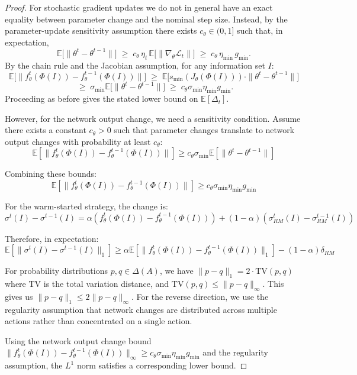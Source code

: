 \documentclass[12pt,a4paper]{article}
\begin{document}
\begin{proof}
For stochastic gradient updates we do not in general have an exact equality between parameter change and the nominal step size.  Instead, by the parameter-update sensitivity assumption there exists $c_\theta\in(0,1]$ such that, in expectation,
    \[
    \mathbb{E}\big[\|\theta^t - \theta^{t-1}\|\big] \;\ge\; c_\theta\,\eta_t\,\mathbb{E}\big[\|\nabla_\theta \mathcal{L}_t\|\big]
    \;\ge\; c_\theta\,\eta_{\min}\,g_{\min}.
    \]
    By the chain rule and the Jacobian assumption, for any information set $I$:
    \[
    \mathbb{E}\big[\|f_\theta^t(\Phi(I)) - f_\theta^{t-1}(\Phi(I))\|\big] \;\ge\; \mathbb{E}\big[s_{\min}(J_\theta(\Phi(I))) \cdot \|\theta^t - \theta^{t-1}\|\big]
    \]
    \[
    \;\ge\; \sigma_{\min} \mathbb{E}\big[\|\theta^t - \theta^{t-1}\|\big] \;\ge\; c_\theta\sigma_{\min}\eta_{\min} g_{\min}.
    \]
Proceeding as before gives the stated lower bound on $\mathbb{E}[\Delta_t]$.
    
However, for the network output change, we need a sensitivity condition. Assume there exists a constant $c_\theta > 0$ such that parameter changes translate to network output changes with probability at least $c_\theta$:
$$\mathbb{E}[\|f_\theta^t(\Phi(I)) - f_\theta^{t-1}(\Phi(I))\|] \geq c_\theta \sigma_{\min} \mathbb{E}[\|\theta^t - \theta^{t-1}\|]$$

Combining these bounds:
$$\mathbb{E}[\|f_\theta^t(\Phi(I)) - f_\theta^{t-1}(\Phi(I))\|] \geq c_\theta \sigma_{\min} \eta_{\min} g_{\min}$$

For the warm-started strategy, the change is:
$$\sigma^t(I) - \sigma^{t-1}(I) = \alpha(f_\theta^t(\Phi(I)) - f_\theta^{t-1}(\Phi(I))) + (1-\alpha)(\sigma_{RM}^t(I) - \sigma_{RM}^{t-1}(I))$$

Therefore, in expectation:
$$\mathbb{E}[\|\sigma^t(I) - \sigma^{t-1}(I)\|_1] \geq \alpha \mathbb{E}[\|f_\theta^t(\Phi(I)) - f_\theta^{t-1}(\Phi(I))\|_1] - (1-\alpha)\delta_{RM}$$

For probability distributions $p, q \in \Delta(A)$, we have $\|p - q\|_1 = 2 \cdot \text{TV}(p,q)$ where $\text{TV}$ is the total variation distance, and $\text{TV}(p,q) \leq \|p - q\|_\infty$. This gives us $\|p - q\|_1 \leq 2\|p - q\|_\infty$. For the reverse direction, we use the regularity assumption that network changes are distributed across multiple actions rather than concentrated on a single action.

Using the network output change bound $\|f_\theta^t(\Phi(I)) - f_\theta^{t-1}(\Phi(I))\|_\infty \geq c_\theta\sigma_{\min} \eta_{\min} g_{\min}$ and the regularity assumption, the $L^1$ norm satisfies a corresponding lower bound. 


\end{proof}
\end{document}
